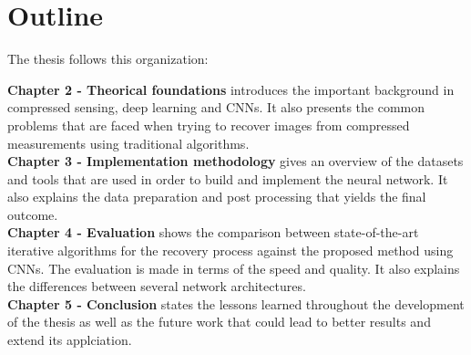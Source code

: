 \section{Outline}
The thesis follows this organization: \

{\bfseries Chapter 2 - Theorical foundations}  introduces the important background in compressed sensing, deep learning and CNNs. It also presents the common problems that are faced when trying to recover images from compressed measurements using traditional algorithms. \\
{\bfseries Chapter 3 - Implementation methodology} gives an overview of the datasets and tools that are used in order to build and implement the neural network. It also explains the data preparation and post processing that yields the final outcome. \\
{\bfseries Chapter 4 - Evaluation} shows the comparison between state-of-the-art iterative algorithms for the recovery process against the proposed method using CNNs. The evaluation is made in terms of the speed and quality. It also explains the differences between several network architectures.  \\
{\bfseries Chapter 5 - Conclusion} states the lessons learned throughout the development of the thesis as well as the future work that could lead to better results and extend its applciation. \\
